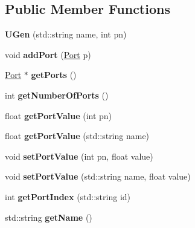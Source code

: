 \subsection*{Public Member Functions}
\begin{DoxyCompactItemize}
\item 
{\bfseries U\+Gen} (std\+::string name, int pn)\hypertarget{classUGen_af2d6d70e1340c9853a9a329cb2db164a}{}\label{classUGen_af2d6d70e1340c9853a9a329cb2db164a}

\item 
void {\bfseries add\+Port} (\hyperlink{classPort}{Port} p)\hypertarget{classUGen_a7d5be76c0847cea2ffd9fb6118dad84b}{}\label{classUGen_a7d5be76c0847cea2ffd9fb6118dad84b}

\item 
\hyperlink{classPort}{Port} $\ast$ {\bfseries get\+Ports} ()\hypertarget{classUGen_a2dbed70294dba960bebb4e6e6196f93f}{}\label{classUGen_a2dbed70294dba960bebb4e6e6196f93f}

\item 
int {\bfseries get\+Number\+Of\+Ports} ()\hypertarget{classUGen_a1f7c0151b63c89a92ea7b3b598969fb5}{}\label{classUGen_a1f7c0151b63c89a92ea7b3b598969fb5}

\item 
float {\bfseries get\+Port\+Value} (int pn)\hypertarget{classUGen_a5790d6f5f741d9286e12f27eafd86bd5}{}\label{classUGen_a5790d6f5f741d9286e12f27eafd86bd5}

\item 
float {\bfseries get\+Port\+Value} (std\+::string name)\hypertarget{classUGen_a2a33803a853db61cc79cc6da90ce511d}{}\label{classUGen_a2a33803a853db61cc79cc6da90ce511d}

\item 
void {\bfseries set\+Port\+Value} (int pn, float value)\hypertarget{classUGen_ae933825c4201f13cb481d399de1bd4d5}{}\label{classUGen_ae933825c4201f13cb481d399de1bd4d5}

\item 
void {\bfseries set\+Port\+Value} (std\+::string name, float value)\hypertarget{classUGen_a1ed212c207052705c9fbd2fb64fe1092}{}\label{classUGen_a1ed212c207052705c9fbd2fb64fe1092}

\item 
int {\bfseries get\+Port\+Index} (std\+::string id)\hypertarget{classUGen_a7caac30e931fe2e39c53be9a084e2709}{}\label{classUGen_a7caac30e931fe2e39c53be9a084e2709}

\item 
std\+::string {\bfseries get\+Name} ()\hypertarget{classUGen_adfb82e003597ca4876f803f0395b28d6}{}\label{classUGen_adfb82e003597ca4876f803f0395b28d6}


\end{DoxyCompactItemize}
